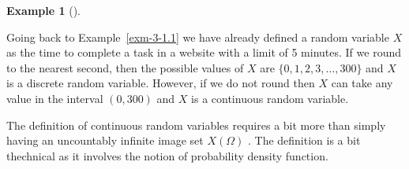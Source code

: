 \documentclass[
  letterpaper,
  DIV=11,
  numbers=noendperiod]{scrreport}
\theoremstyle{definition}
\newtheorem{example}{Example}[chapter]
\theoremstyle{plain}
\theoremstyle{definition}
\theoremstyle{plain}
\theoremstyle{remark}
\begin{document}
\begin{tcolorbox}[enhanced jigsaw, breakable, opacityback=0, leftrule=.75mm, colback=white, bottomtitle=1mm, coltitle=black, toptitle=1mm, titlerule=0mm, bottomrule=.15mm, colframe=quarto-callout-note-color-frame, title={Continuous vs Discrete Random Variables}, opacitybacktitle=0.6, colbacktitle=quarto-callout-note-color!10!white, rightrule=.15mm, arc=.35mm, toprule=.15mm, left=2mm]

\begin{example}[]\protect\hypertarget{exm-time-website-random-variable}{}\label{exm-time-website-random-variable}

Going back to Example~\ref{exm-3-1.1} we have already defined a random
variable \(X\) as the time to complete a task in a website with a limit
of 5 minutes. If we round to the nearest second, then the possible
values of \(X\) are \(\{0,1, 2, 3, \ldots, 300\}\) and \(X\) is a
discrete random variable. However, if we do not round then \(X\) can
take any value in the interval \((0,300)\) and \(X\) is a continuous
random variable.

\end{example}

\end{tcolorbox}

The definition of continuous random variables requires a bit more than
simply having an uncountably infinite image set \(X(\Omega)\) . The
definition is a bit thechnical as it involves the notion of probability
density function.
\end{document}
